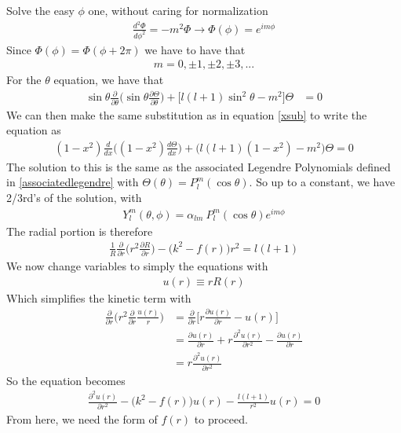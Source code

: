 Solve the easy $\phi$ one, without caring for normalization
\begin{align}
\frac{d^2\Phi}{d\phi^2} = -m^2\Phi \rightarrow \Phi(\phi) = e^{im\phi}
\end{align}
Since $\Phi(\phi) = \Phi(\phi+2\pi)$ we have to have that 
\begin{align}
m = 0,\pm 1, \pm 2, \pm 3, ...
\end{align}
For the $\theta$ equation, we have that
\begin{align}
\sin\theta\frac{\partial}{\partial\theta}\Big(\sin\theta\frac{\partial \Theta}{\partial\theta}\Big) +\Big[l(l+1)\sin^2\theta-m^2\Big]\Theta &= 0
\end{align}
We can then make the same substitution as in equation \ref{xsub} to write the equation as
\begin{align}
(1-x^2)\frac{d}{dx}\Big((1-x^2)\frac{d\Theta}{dx}\Big) + \Big(l(l+1)(1-x^2)-m^2\Big)\Theta = 0
\end{align}
The solution to this is the same as the associated Legendre Polynomials defined in \ref{associatedlegendre} with $\Theta(\theta) = P_l^m(\cos\theta)$. So up to a constant, we have 2/3rd's of the solution, with 
\begin{align}
Y_l^m(\theta,\phi) = \alpha_{lm}~P_l^m(\cos\theta)e^{im\phi}
\end{align}
The radial portion is therefore
\begin{align}
\frac{1}{R}\frac{\partial}{\partial r}\Big(r^2\frac{\partial R}{\partial r}\Big) -\Big(k^2 - f(r)\Big)r^2 = l(l+1)
\end{align}
We now change variables to simply the equations with
\begin{align}
u(r) \equiv rR(r)
\end{align}
Which simplifies the kinetic term with
\begin{align}
\frac{\partial}{\partial r}\Big(r^2\frac{\partial }{\partial r}\frac{u(r)}{r}\Big)  &= \frac{\partial}{\partial r}\Big[r\frac{\partial u(r)}{\partial r} - u(r)\Big]\\
&= \frac{\partial u(r)}{\partial r} + r\frac{\partial^2 u(r)}{\partial r^2} - \frac{\partial u(r)}{\partial r}\\
&= r\frac{\partial^2 u(r)}{\partial r^2}
\end{align}
So the equation becomes
\begin{align}
\frac{\partial^2 u(r)}{\partial r^2} -\Big(k^2 - f(r)\Big)u(r)-\frac{l(l+1)}{r^2}u(r) = 0
\end{align}
From here, we need the form of $f(r)$ to proceed.



